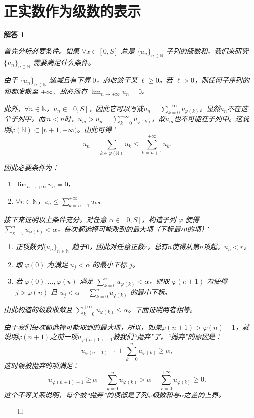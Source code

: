 \documentclass[12pt,UTF8,fontset=none]{ctexbook}
\theoremstyle{exercisestyle}
\theoremstyle{solutionstyle}
\newtheorem*{solution*}{解答}
\newenvironment{solution}
  {\begin{solution*}}
  {\hfill\ensuremath{\qed}\end{solution*}}
\begin{document}
\section{正实数作为级数的表示}
\begin{solution}
\begin{subquestions}
\item 首先分析必要条件。如果 $\forall x \in [0, S]$ 总是 $\{u_n\}_{n\in\mathbb{N}}$ 子列的级数和，我们来研究 $\{u_n\}_{n\in\mathbb{N}}$ 需要满足什么条件。

由于 $\{u_n\}_{n\in\mathbb{N}}$ 递减且有下界 $0$，必收敛于某 $\ell \geqslant 0$。若 $\ell > 0$，则任何子序列的和都发散至 $+\infty$，故必须有 $\displaystyle \lim_{n \to +\infty} u_n = 0$。

此外，$\forall n \in \mathbb{N}$，$u_n\in [0, S]$，因此它可以写成$\displaystyle u_n = \sum_{k=0}^{+\infty} u_{\varphi(k)}$。显然$u_n$不在这个子列中。而$m < n$时，$\displaystyle u_m > u_n = \sum_{k=0}^{+\infty} u_{\varphi(k)}$，故$u_m$也不可能在子列中。这说明$\varphi(\mathbb{N}) \subset [n+1, +\infty)$。由此可得：
$$
u_n = \sum_{k\in\varphi(\mathbb{N})} u_k \leqslant \sum_{k=n+1}^{+\infty} u_k.
$$

因此必要条件为：
\begin{enumerate}[label=\arabic*.]
    \item $\displaystyle\lim_{n \to +\infty} u_n = 0$，
    \item $\forall n \in \mathbb{N}$，$\displaystyle u_n \leq \sum_{k=n+1}^{+\infty} u_k$。
\end{enumerate}

接下来证明以上条件充分。对任意 $\alpha \in [0, S]$，构造子列 $\varphi$ 使得 $\displaystyle\sum_{k=0}^n u_{\varphi(k)} < \alpha$，每次都选择可能取到的最大项（下标最小的项）：
\begin{enumerate}[label=\arabic*.]
\item 正项数列$\{u_n\}_{n\in\mathbb{N}}$ 趋于$0$，因此对任意正数$r$，总有$n$使得从第$n$项起，$u_n < r$。
\item 取 $\varphi(0)$ 为满足 $u_j < \alpha$ 的最小下标 $j$。
\item 若 $\varphi(0),\dots,\varphi(n)$ 满足 $\sum_{k=0}^n u_{\varphi(k)} < \alpha$，则取 $\varphi(n+1)$ 为使得 $j > \varphi(n)$ 且 $u_j < \alpha - \sum_{k=0}^n u_{\varphi(k)}$ 的最小下标。
\end{enumerate}

由此构造的级数收敛且 $\displaystyle \sum_{k=0}^{+\infty} u_{\varphi(k)} \leq \alpha$。下面证明两者相等。

由于我们每次都选择可能取到的最大项，所以，如果$\varphi(n+1) > \varphi(n)+1$，就说明$\varphi(n+1)$之前一项$u_{\varphi(n+1)-1}$被我们“抛弃”了。“抛弃”的原因是：
$$  u_{\varphi(n+1)-1} + \sum_{k=0}^n u_{\varphi(k)} \geqslant \alpha, $$
这时候被抛弃的项满足：
$$
u_{\varphi(n+1)-1} \geqslant \alpha - \sum_{k=0}^n u_{\varphi(k)} > \alpha - \sum_{k=0}^{+\infty} u_{\varphi(k)} \geqslant 0.
$$
这个不等关系说明，每个被“抛弃”的项都是子列$\varphi$级数和与$\alpha$之差的上界。


\end{subquestions}
\end{solution}
\end{document}
